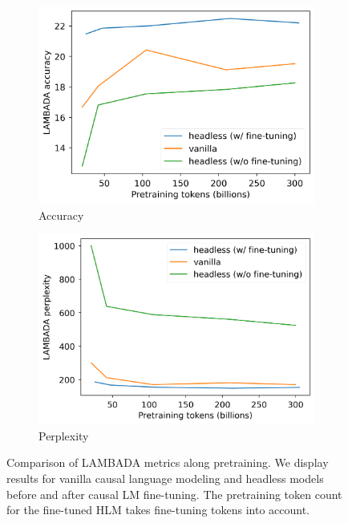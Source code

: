 \begin{figure}
    \centering
    \begin{subfigure}[b]{0.48\linewidth}
         \includegraphics[width=\linewidth]{sources/part_2/headless/imgs/lambada_acc_p13.png}
         \caption{Accuracy}
         \label{fig:lambada_acc}
    \end{subfigure}
    \begin{subfigure}[b]{0.48\linewidth}
         \includegraphics[width=\linewidth]{sources/part_2/headless/imgs/lambada_ppl_p13.png}
         \caption{Perplexity}
         \label{fig:lambada_ppl}
    \end{subfigure}
    \caption{Comparison of LAMBADA metrics along pretraining. We display results for vanilla causal language modeling and headless models before and after causal LM fine-tuning. The pretraining token count for the fine-tuned HLM takes fine-tuning tokens into account.}
    \label{fig:train_curve_lm}
\end{figure}

